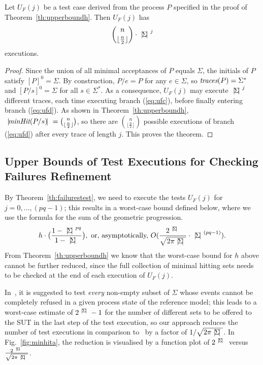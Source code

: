 \begin{theorem}\label{th:numexecP}
Let $U_F(j)$ be a test case derived from the 
process $P$ specified in the proof of Theorem~\ref{th:upperboundh}. Then
$U_F(j)$ has
\[
\binom{n}{\lfloor\frac{n}{2}\rfloor}\cdot {~|\! \Sigma\!|~}^j
\]
executions.
\end{theorem}
\begin{proof}
Since the union of all minimal acceptances of $P$ equals $\Sigma$, 
the initials of $P$ satisfy $[P]^0 = \Sigma$. By construction, $P/e = P$
for any $e\in\Sigma$, so $\text{\it traces}(P) = \Sigma^*$ and $[P/s]^0 = \Sigma$
for all $s\in\Sigma^*$. As a consequence, $U_F(j)$
may execute ${~|\! \Sigma\!|~}^j$ different traces, each time executing branch (\ref{eq:ufc}),
before finally entering branch (\ref{eq:ufd}). As shown in Theorem~\ref{th:upperboundh},
${~|\! \text{\it minHit}(P/s)\!|~} =  \binom{n}{\lfloor\frac{n}{2}\rfloor}$, so there are
$\binom{n}{\lfloor\frac{n}{2}\rfloor}$ possible executions of branch (\ref{eq:ufd})
after every trace of length $j$. This proves the theorem.
\xbox
\end{proof}

\subsection{Upper Bounds of Test Executions for Checking Failures Refinement}

By Theorem~\ref{th:failurestest}, we need to execute the tests $U_F(j)$ for
$j = 0,\dots,(pq-1)$; this results in a worst-case bound defined below, where
we use the formula for the sum of the geometric progression.
%
\[
h\cdot \big( \frac{1-\card{\Sigma}^{pq}}{1-\card{\Sigma}} \big),\
 \text{or, asymptotically,}\  O(\frac{2^\card{\Sigma}}{\sqrt{2\pi \card{\Sigma}}}\cdot\card{\Sigma}^{(pq-1)}).
 \]
%
From Theorem~\ref{th:upperboundh} we know that the worst-case bound for $h$
above cannot be further reduced, since the full collection of minimal hitting
sets needs to be checked at the end of each execution of $U_F(j)$.

In~\cite{Hennessy:1988:ATP:50497}, it is suggested to test {\it every}
non-empty subset of $\Sigma$ whose events cannot be completely refused in a
given process state of the reference model; this leads to a worst-case
estimate of $2^{{~|\! \Sigma\!|~}}-1$ for the number of different sets to be
offered to the SUT in the last step of the test execution, so our approach
reduces the number of test executions in comparison
to~\cite{Hennessy:1988:ATP:50497} by a factor of $1/{\sqrt{2\pi
{~|\! \Sigma\!|~}}}$. In Fig.~\ref{fig:minhita}, the reduction is visualised by a
function plot of $2^{{~|\! \Sigma\!|~}}$ versus
$\frac{2^{~|\! \Sigma\!|~}}{\sqrt{2\pi {~|\! \Sigma\!|~}}}$.

